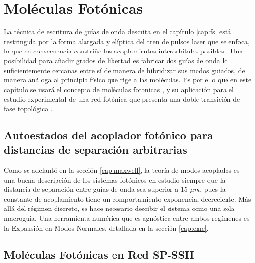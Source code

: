\chapter{Moléculas Fotónicas}

La técnica de escritura de guías de onda descrita en el capítulo \ref{cap:fs} está restringida por la forma alargada y elíptica del tren de pulsos laser que se enfoca, lo que en consecuencia constriñe los acoplamientos interorbitales posibles \citep{interorbital}. Una posibilidad para añadir grados de libertad es fabricar dos guías de onda lo suficientemente cercanas entre sí de manera de hibridizar sus modos guiados, de manera análoga al principio físico que rige a las moléculas. Es por ello que en este capítulo se usará el concepto de moléculas fotonicas \citep{molecules}, y su aplicación para el estudio experimental de una red fotónica que presenta una doble transición de fase topológica \citep{SPSSH}.

\section{Autoestados del acoplador fotónico para distancias de separación arbitrarias}

Como se adelantó en la sección \ref{cap:maxwell}, la teoría de modos acoplados es una buena descripción de los sistemas fotónicos en estudio siempre que la distancia de separación entre guías de onda sea superior a 15 $\mu m$, pues la constante de acoplamiento tiene un comportamiento exponencial decreciente. Más allá del régimen discreto, se hace necesario descibir el sistema como una sola macroguía. Una herramienta numérica que es agnóstica entre ambos regímenes es la Expansión en Modos Normales, detallada en la sección \ref{cap:eme}.

\section{Moléculas Fotónicas en Red SP-SSH}
